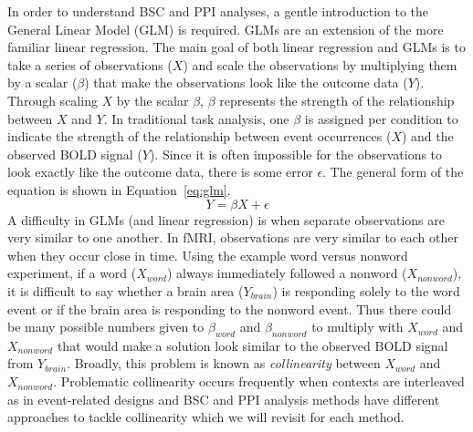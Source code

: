\documentclass[phd,figures,tables,ackpage,abstractpage,publicabstractpage]{uithesis}
\begin{document}
In order to understand BSC and PPI analyses, a gentle introduction to the
General Linear Model (GLM) is required.
GLMs are an extension of the more familiar linear regression.
The main goal of both linear regression and GLMs is to take
a series of observations ($X$) and scale the observations by
multiplying them by a scalar ($\beta$) that make the observations
look like the outcome data ($Y$).
Through scaling $X$ by the scalar $\beta$,
$\beta$ represents the strength of the relationship
between $X$ and $Y$.
In traditional task analysis, one $\beta$ is assigned per condition
to indicate the strength of the relationship between event occurrences
($X$) and the observed BOLD signal ($Y$). 
Since it is often impossible for the observations to look exactly like
the outcome data, there is some error $\epsilon$.
The general form of the equation is shown in Equation~\ref{eq:glm}.
\begin{equation}
  Y = \beta X + \epsilon
  \label{eq:glm}
\end{equation}
A difficulty in GLMs (and linear regression) is when separate observations are very similar to one another.
In fMRI, observations are very similar to each other when they occur close in time.
Using the example word versus nonword experiment, if a word ($X_{word}$) always immediately
followed a nonword ($X_{nonword}$), it is difficult to say whether
a brain area ($Y_{brain}$) is responding solely to the word event
or if the brain area is responding to the nonword event.
Thus there could be many possible numbers given to $\beta_{word}$ and $\beta_{nonword}$
to multiply with $X_{word}$ and $X_{nonword}$ that would make a solution look similar to
the observed BOLD signal from $Y_{brain}$.
Broadly, this problem is known as \textit{collinearity} between $X_{word}$ and $X_{nonword}$. 
Problematic collinearity occurs frequently when contexts are interleaved as in event-related designs and
BSC and PPI analysis methods have different approaches to tackle collinearity
which we will revisit for each method.
\end{document}
